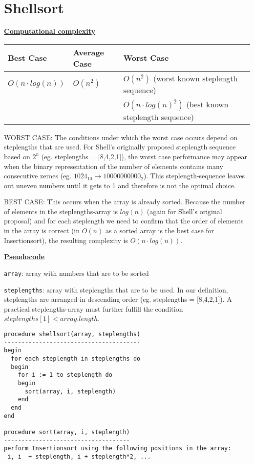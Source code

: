 \documentclass[a4paper]{report}
\begin{document}
\chapter*{Shellsort}

\underline{\bf{Computational complexity}}

\begin{tabular}{|l|l| l |}
\hline
Best Case    & Average Case  &  Worst Case\\ \hline
$O(n\cdot log(n))$ & $O(n^2)$  &  $O(n^2)$ (worst known steplength sequence) \\
& & $O(n\cdot log(n)^2)$ (best known steplength sequence) \\ \hline
\end{tabular}

WORST CASE: The conditions under which the worst case occurs depend on steplengths that are used. For Shell's originally proposed steplength sequence based on $2^n$ (eg. steplengths = [8,4,2,1]), the worst case performance may appear when the binary representation of the number of elements contains many consecutive zeroes (eg. $1024_{10} \rightarrow 10000000000_2$). This steplength-sequence leaves out uneven numbers until it gets to 1 and therefore is not the optimal choice.

BEST CASE: This occurs when the array is already sorted. Because the number of elements in the steplengths-array is $log(n)$ (again for Shell's original proposal) and for each steplength we need to confirm that the order of elements in the array is correct (in $O(n)$ as a sorted array is the best case for Insertionsort), the resulting complexity is $O(n \cdot log(n))$.


\underline{\bf{Pseudocode}}

\texttt{array}: array with numbers that are to be sorted

\texttt{steplengths}: array with steplengths that are to be used. In our definition, steplengths are arranged in descending order (eg. steplengths = [8,4,2,1]). A practical steplengths-array must further fulfill the condition $steplengths[1] < array.length$. 


\begin{lstlisting}
procedure shellsort(array, steplengths)
---------------------------------------
begin
  for each steplength in steplengths do
  begin
    for i := 1 to steplength do
    begin
  	  sort(array, i, steplength)   
    end
  end
end

procedure sort(array, i, steplength)
------------------------------------
perform Insertionsort using the following positions in the array:
 i, i  + steplength, i + steplength*2, ...

\end{lstlisting}
\end{document}
